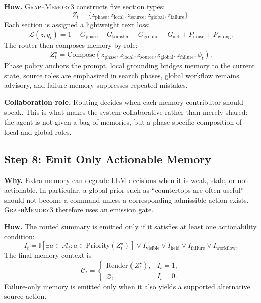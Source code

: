\documentclass[11pt]{article}
\newcommand{\modelname}{\textsc{GraphMemory3}\xspace}
\newcommand{\actions}{\mathcal{A}}
\begin{document}
\textbf{How.} \modelname constructs five section types:
\begin{equation}
    Z_t =
    \{
    z_{\mathrm{phase}},
    z_{\mathrm{local}},
    z_{\mathrm{source}},
    z_{\mathrm{global}},
    z_{\mathrm{failure}}
    \}.
\end{equation}
Each section is assigned a lightweight text loss:
\begin{equation}
    \mathcal{L}(z,q_t)
    =
    1
    -G_{\mathrm{phase}}
    -G_{\mathrm{transfer}}
    -G_{\mathrm{ground}}
    -G_{\mathrm{act}}
    +P_{\mathrm{noise}}
    +P_{\mathrm{wrong}}.
\end{equation}
The router then composes memory by role:
\begin{equation}
    Z_t^\star =
    \mathrm{Compose}
    \left(
    z_{\mathrm{phase}},
    z_{\mathrm{local}},
    z_{\mathrm{source}},
    z_{\mathrm{global}},
    z_{\mathrm{failure}};
    \phi_t
    \right).
\end{equation}
Phase policy anchors the prompt, local grounding bridges memory to the current
state, source roles are emphasized in search phases, global workflow remains
advisory, and failure memory suppresses repeated mistakes.

\textbf{Collaboration role.} Routing decides when each memory contributor should
speak. This is what makes the system collaborative rather than merely shared: the
agent is not given a bag of memories, but a phase-specific composition of local
and global roles.

\subsection{Step 8: Emit Only Actionable Memory}

\textbf{Why.} Extra memory can degrade LLM decisions when it is weak, stale, or not
actionable. In particular, a global prior such as ``countertops are often useful''
should not become a command unless a corresponding admissible action exists.
\modelname therefore uses an emission gate.

\textbf{How.} The routed summary is emitted only if it satisfies at least one
actionability condition:
\begin{equation}
    I_t =
    \mathbb{I}
    \left[
    \exists a\in\actions_t:
    a\in\mathrm{Priority}(Z_t^\star)
    \right]
    \vee I_{\mathrm{visible}}
    \vee I_{\mathrm{held}}
    \vee I_{\mathrm{failure}}
    \vee I_{\mathrm{workflow}}.
\end{equation}
The final memory context is
\begin{equation}
    \mathcal{C}_t =
    \begin{cases}
    \mathrm{Render}(Z_t^\star), & I_t=1,\\
    \varnothing, & I_t=0.
    \end{cases}
\end{equation}
Failure-only memory is emitted only when it also yields a supported alternative
source action.
\end{document}
